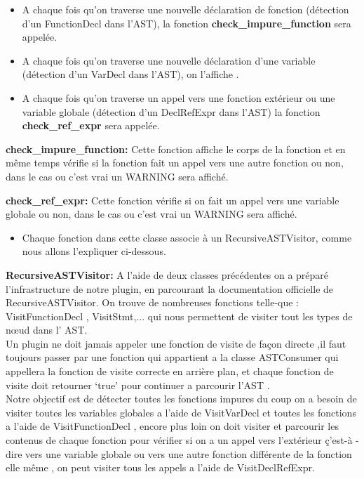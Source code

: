 \documentclass[12pt,titlepage]{article}
\begin{document}
\begin{itemize}
\item A chaque fois qu’on traverse une nouvelle déclaration de fonction (détection d’un FunctionDecl dans l’AST), la fonction \textbf{check\_impure\_function}  sera appelée.
\item A chaque fois qu’on traverse une nouvelle déclaration d’une variable (détection d’un VarDecl dans l’AST), on l’affiche .
 \item A chaque fois qu’on traverse un appel vers une fonction extérieur ou une variable globale (détection d’un DeclRefExpr dans l’AST) la fonction \textbf{ check\_ref\_expr} sera appelée.
 \end{itemize}

\textbf{check\_impure\_function:}
 Cette fonction affiche le corps de la fonction et en même temps vérifie si la fonction fait un appel vers une autre fonction ou non, dans le cas ou c’est vrai un WARNING sera affiché. 

\textbf{check\_ref\_expr:}	
 Cette fonction vérifie si on fait un appel vers une variable globale ou non, dans le cas ou c’est vrai un WARNING sera affiché. 
\begin{itemize}
\item Chaque fonction dans cette classe associe à un RecursiveASTVisitor, comme nous allons l’expliquer ci-dessous.
\end{itemize}

\textbf{RecursiveASTVisitor:}
A l’aide de deux classes précédentes on a préparé l’infrastructure de notre plugin,  en parcourant  la documentation officielle de RecursiveASTVisitor. On trouve de nombreuses fonctions  telle-que :  VisitFunctionDecl , VisitStmt,... qui nous  permettent de visiter tout les types de nœud dans l’ AST.\\
Un plugin ne doit jamais appeler une fonction de visite de façon directe ,il faut toujours passer par une fonction qui appartient a  la classe ASTConsumer qui appellera la fonction de visite correcte en arrière plan, et chaque fonction de visite doit retourner ‘true’ pour continuer a parcourir l’AST  . \\

Notre objectif est de détecter toutes les fonctions impures du coup on a besoin de visiter toutes les variables globales a l’aide  de  VisitVarDecl et toutes les fonctions a l’aide de VisitFunctionDecl , encore plus loin on doit visiter et parcourir les contenus de chaque fonction pour vérifier si on a un appel vers l’extérieur ç’est-à -dire vers une variable globale ou vers une autre fonction différente de la fonction elle même , on peut visiter tous les appels a l’aide de VisitDeclRefExpr.\\
\end{document}
